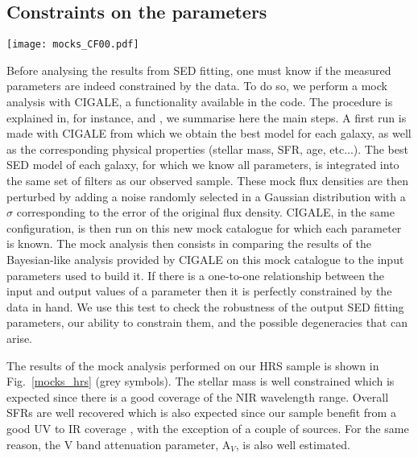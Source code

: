 \documentclass[traditabstract]{aa} %
\begin{document}
\subsection{\label{cons}Constraints on the parameters}

\begin{figure*}[!h] 
  	\texttt{[image: mocks\_CF00.pdf]}
  	\caption{\label{mocks_hrs} Results of the mock analysis. The input parameters used to build the mock catalogue are shown on the x-axis while the results of the fitting of the mock catalogues are shown on the y-axis. A good constraint on a given parameter is obtained when there is a one-to-one relationship, which is indicated by the black solid lines. Grey dots are all HRS sources sample while blue circles are the galaxies selected as rapidly quenched.}
\end{figure*}

Before analysing the results from SED fitting, one must know if the measured parameters are indeed constrained by the data.
To do so, we perform a mock analysis with CIGALE, a functionality available in the code.
The procedure is explained in, for instance, \cite{Giovannoli11} and \cite{Boquien19}, we summarise here the main steps.
A first run is made with CIGALE from which we obtain the best model for each galaxy, as well as the corresponding physical properties (stellar mass, SFR, age, etc...).
The best SED model of each galaxy, for which we know all parameters, is integrated into the same set of filters as our observed sample.
These mock flux densities are then perturbed by adding a noise randomly selected in a Gaussian distribution with a $\sigma$ corresponding to the error of the original flux density.
CIGALE, in the same configuration, is then run on this new mock catalogue for which each parameter is known.
The mock analysis then consists in comparing the results of the Bayesian-like analysis provided by CIGALE on this mock catalogue to the input parameters used to build it. 
If there is a one-to-one relationship between the input and output values of a parameter then it is perfectly constrained by the data in hand.
We use this test to check the robustness of the output SED fitting parameters, our ability to constrain them, and the possible degeneracies that can arise. 


The results of the mock analysis performed on our HRS sample is shown in Fig.~\ref{mocks_hrs} (grey symbols).
The stellar mass is well constrained which is expected since there is a good coverage of the NIR wavelength range.
Overall SFRs are well recovered which is also expected since our sample benefit from a good UV to IR coverage \citep{Buat14}, with the exception of a couple of sources.
For the same reason, the V band attenuation parameter, A$_V$, is also well estimated.
\end{document}
